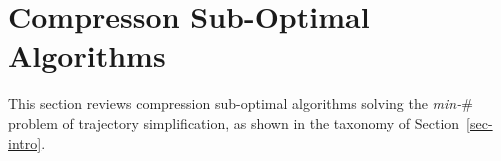 
\section{Compresson Sub-Optimal Algorithms}
\label{sec-subopt}



This section reviews compression sub-optimal algorithms solving the \emph{min-$\#$} problem of trajectory simplification, as shown in the taxonomy of Section~\ref{sec-intro}.









